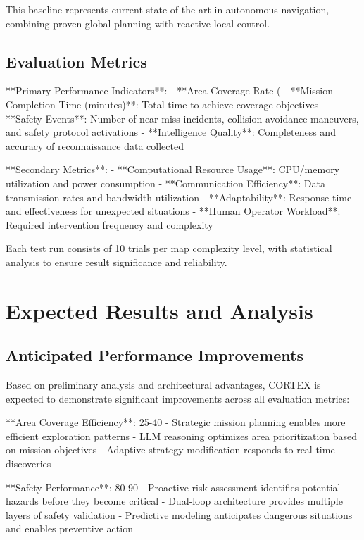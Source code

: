 This baseline represents current state-of-the-art in autonomous navigation, combining proven global planning with reactive local control.

\subsection{Evaluation Metrics}

**Primary Performance Indicators**:
- **Area Coverage Rate (%
- **Mission Completion Time (minutes)**: Total time to achieve coverage objectives
- **Safety Events**: Number of near-miss incidents, collision avoidance maneuvers, and safety protocol activations
- **Intelligence Quality**: Completeness and accuracy of reconnaissance data collected

**Secondary Metrics**:
- **Computational Resource Usage**: CPU/memory utilization and power consumption
- **Communication Efficiency**: Data transmission rates and bandwidth utilization
- **Adaptability**: Response time and effectiveness for unexpected situations
- **Human Operator Workload**: Required intervention frequency and complexity

Each test run consists of 10 trials per map complexity level, with statistical analysis to ensure result significance and reliability.

\section{Expected Results and Analysis}

\subsection{Anticipated Performance Improvements}

Based on preliminary analysis and architectural advantages, CORTEX is expected to demonstrate significant improvements across all evaluation metrics:

**Area Coverage Efficiency**: 25-40%
- Strategic mission planning enables more efficient exploration patterns
- LLM reasoning optimizes area prioritization based on mission objectives
- Adaptive strategy modification responds to real-time discoveries

**Safety Performance**: 80-90%
- Proactive risk assessment identifies potential hazards before they become critical
- Dual-loop architecture provides multiple layers of safety validation
- Predictive modeling anticipates dangerous situations and enables preventive action


